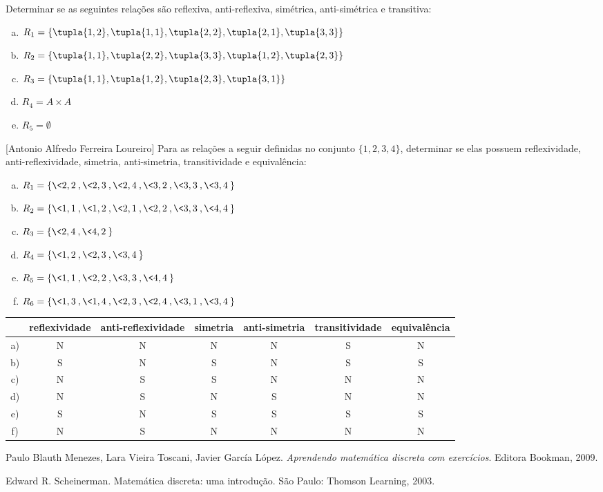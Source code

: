 \exercise{} Determinar se as seguintes rela\c{c}\~oes s\~ao reflexiva,
anti-reflexiva, sim\'etrica, anti-sim\'etrica e transitiva:

\begin{enumerate}[(a)]
\item
$R_1=\{\tupla{1,2},\tupla{1,1},\tupla{2,2},\tupla{2,1},\tupla{3,3}\}$
\item
$R_2=\{\tupla{1,1},\tupla{2,2},\tupla{3,3},\tupla{1,2},\tupla{2,3}\}$
\item $R_3=\{\tupla{1,1},\tupla{1,2},\tupla{2,3},\tupla{3,1}\}$
\item $R_4 = A\times A$
\item $R_5 = \emptyset$
\end{enumerate}

\exercise{} [Antonio Alfredo Ferreira Loureiro] Para as relações a
seguir definidas no conjunto $\{1,2,3,4\}$, determinar se elas possuem
reflexividade, anti-reflexividade, simetria, anti-simetria,
transitividade e equivalência:

\begin{enumerate}[a)]
\item $R_1=\{\<2,2\>,\<2,3\>,\<2,4\>,\<3,2\>,\<3,3\>,\<3,4\>\}$ %
\item $R_2=\{\<1,1\>,\<1,2\>,\<2,1\>,\<2,2\>,\<3,3\>,\<4,4\>\}$ %
\item $R_3=\{\<2,4\>,\<4,2\>\}$ %
\item $R_4=\{\<1,2\>,\<2,3\>,\<3,4\>\}$ %
\item $R_5=\{\<1,1\>,\<2,2\>,\<3,3\>,\<4,4\>\}$ %
\item $R_6=\{\<1,3\>,\<1,4\>,\<2,3\>,\<2,4\>,\<3,1\>,\<3,4\>\}$ %
\end{enumerate}

\begingroup{}
\begin{center}\footnotesize
\begin{tabular}{c|c|c|c|c|c|c}\hline
 &  reflexividade & anti-reflexividade& simetria& anti-simetria&transitividade & equivalência\\\hline
 a)& N&N&N&N&S&N\\\hline
 b)& S&N&S&N&S&S\\\hline
 c)& N&S&S&N&N&N\\\hline
 d)& N&S&N&S&N&N\\\hline
 e)& S&N&S&S&S&S\\\hline
 f)& N&S&N&N&N&N\\\hline
\end{tabular}
\end{center}
\endgroup

\begin{thebibliography}{1}
 Paulo Blauth Menezes, Lara Vieira
Toscani, Javier García López. \emph{Aprendendo matemática discreta com
exercícios}. Editora Bookman, 2009.

 Edward R. Scheinerman. Matemática
  discreta: uma introdução. São Paulo: Thomson Learning, 2003.
\end{thebibliography}


